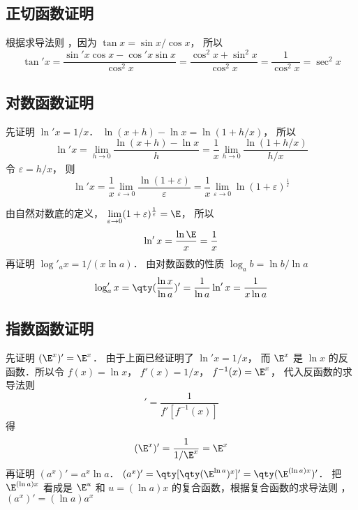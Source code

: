 \subsection{正切函数证明}
根据求导法则%
，因为 $\tan x = \sin x/\cos x$， 所以
\begin{equation}
\tan' x = \frac{\sin' x \cos x - \cos' x\sin x}{\cos^2 x} = \frac{\cos^2x + \sin^2 x}{\cos^2 x} = \frac{1}{\cos ^2 x} = \sec ^2 x
\end{equation}
\subsection{对数函数证明}
先证明 $\ln' x = {1}/{x}$．  $\ln(x + h) - \ln x = \ln(1 + h/x)$， 所以
 \begin{equation}
\ln 'x = \lim_{h \to 0} \frac{\ln(x + h) - \ln x}{h} = \frac{1}{x} \lim_{h \to 0} \frac{\ln(1 + h/x)}{h/x}
\end{equation}
令 $\varepsilon  = h/x$， 则
\begin{equation}
\ln' x = \frac{1}{x} \lim_{\varepsilon  \to 0} \frac{\ln(1 + \varepsilon)}{\varepsilon } = \frac{1}{x} \lim_{\varepsilon  \to 0} \ln(1 + \varepsilon)^{\frac{1}{\varepsilon }} 
\end{equation}
 
由自然对数底的定义， $\lim\limits_{\varepsilon  \to 0} (1 + \varepsilon)^{\frac{1}{\varepsilon }} = \E$， 所以
 \begin{equation}
\ln 'x = \frac{\ln \E}{x} = \frac{1}{x}
\end{equation}
再证明 $\log'_a x = {1}/(x\ln a)$． 
由对数函数的性质 $\log_a b = \ln b/\ln a$
\begin{equation}
\log'_a x = \qty(\frac{\ln x}{\ln a})' = \frac{1}{\ln a}\ln' x = \frac{1}{x\ln a}
\end{equation}

\subsection{指数函数证明}
先证明 $(\E^x)' = \E^x$． 
由于上面已经证明了 $ \ln'x = 1/x$， 而 $\E^x$ 是 $\ln x$ 的反函数．所以令 $f(x) = \ln x$， $f'(x) = 1/x$，  $f^{ - 1} (x) = \E^x$， 代入反函数的求导法则%
\begin{equation}
[f^{-1} (x)]' = \frac{1}{f'[f^{ - 1}(x)]}
\end{equation} 
得
\begin{equation}
(\E^x)' = \frac{1}{1/\E^x} = \E^x
\end{equation}
再证明 $(a^x)' = a^x \ln a$．  $(a^x)' = \qty[ \qty( \E^{\ln a} )^x ]' = \qty( \E^{(\ln a) x} )'$． 把 $\E^{(\ln a) x}$ 看成是 $\E^u$ 和 $u = (\ln a) x$ 的复合函数，根据复合函数的求导法则 ，$(a^x)' = (\ln a) a^x$ 



















